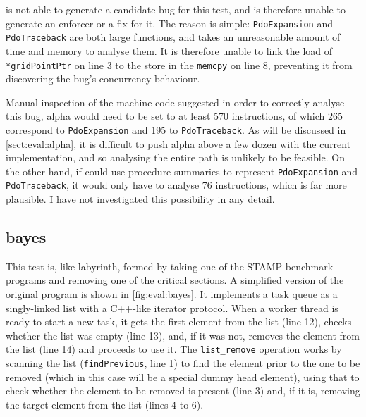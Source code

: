 {\Implementation} is not able to generate a candidate bug for this
test, and is therefore unable to generate an enforcer or a fix for it.
The reason is simple: \texttt{PdoExpansion} and \texttt{PdoTraceback}
are both large functions, and {\implementation} takes an unreasonable
amount of time and memory to analyse them.  It is therefore unable to
link the load of \texttt{*gridPointPtr} on line 3 to the store in the
\texttt{memcpy} on line 8, preventing it from discovering the bug's
concurrency behaviour.

Manual inspection of the machine code suggested in order to correctly
analyse this bug, \gls{alpha} would need to be set to at least 570
instructions, of which 265 correspond to \texttt{PdoExpansion} and 195
to \texttt{PdoTraceback}.  As will be discussed in
\autoref{sect:eval:alpha}, it is difficult to push \gls{alpha} above a
few dozen with the current implementation, and so analysing the entire
path is unlikely to be feasible.  On the other hand, if {\technique}
could use procedure summaries\needCite{} to represent
\texttt{PdoExpansion} and \texttt{PdoTraceback}, it would only have to
analyse 76 instructions, which is far more plausible.  I have not
investigated this possibility in any detail.

\subsection{bayes}

This test is, like labyrinth, formed by taking one of the STAMP
benchmark programs and removing one of the critical sections.  A
simplified version of the original program is shown in
\autoref{fig:eval:bayes}.  It implements a task queue as a
singly-linked list with a C++-like iterator protocol\needCite{}.  When
a worker thread is ready to start a new task, it gets the first
element from the list (line 12), checks whether the list was empty
(line 13), and, if it was not, removes the element from the list (line
14) and proceeds to use it.  The \texttt{list\_remove} operation works
by scanning the list (\texttt{findPrevious}, line 1) to find the
element prior to the one to be removed (which in this case will be a
special dummy head element), using that to check whether the element
to be removed is present (line 3) and, if it is, removing the target
element from the list (lines 4 to 6).

